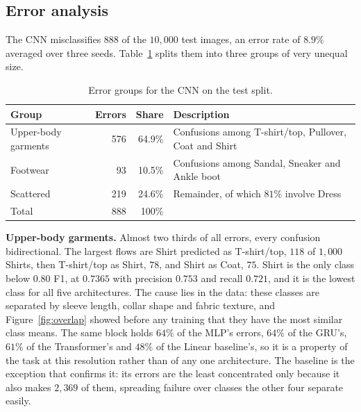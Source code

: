 \subsection{Error analysis}
\label{subsec:results-5}

The CNN misclassifies $888$ of the $10{,}000$ test images, an error rate of $8.9\%$ averaged over
three seeds. Table~\ref{tab:error-groups} splits them into three groups of very unequal size.

\begin{table}[H]
\centering
\caption{Error groups for the CNN on the test split.}
\label{tab:error-groups}
\begin{tabularx}{\textwidth}{lrrX}
\hline
\textbf{Group} & \textbf{Errors} & \textbf{Share} & \textbf{Description} \\
\hline
Upper-body garments & 576 & 64.9\% & Confusions among T-shirt/top, Pullover, Coat and Shirt \\
Footwear            &  93 & 10.5\% & Confusions among Sandal, Sneaker and Ankle boot \\
Scattered           & 219 & 24.6\% & Remainder, of which $81\%$ involve Dress \\
\hline
Total               & 888 & 100\% & \\
\hline
\end{tabularx}
\end{table}

\textbf{Upper-body garments.} Almost two thirds of all errors, every confusion bidirectional. The
largest flows are Shirt predicted as T-shirt/top, $118$ of $1{,}000$ Shirts, then T-shirt/top as
Shirt, $78$, and Shirt as Coat, $75$. Shirt is the only class below $0.80$ F1, at $0.7365$ with
precision $0.753$ and recall $0.721$, and it is the lowest class for all five architectures. The
cause lies in the data: these classes are separated by sleeve length, collar shape and fabric
texture, and Figure~\ref{fig:overlap} showed before any training that they have the most similar
class means. The same block holds $64\%$ of the MLP's errors, $64\%$ of the GRU's, $61\%$ of the
Transformer's and $48\%$ of the Linear baseline's, so it is a property of the task at this
resolution rather than of any one architecture. The baseline is the exception that confirms it:
its errors are the least concentrated only because it also makes $2{,}369$ of them, spreading
failure over classes the other four separate easily.

